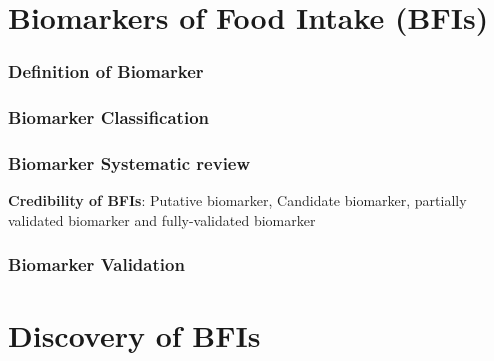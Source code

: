 \section{Biomarkers of Food Intake (BFIs)}
\subsubsection{Definition of Biomarker}

\subsubsection{Biomarker Classification}


\subsubsection{Biomarker Systematic review}
\textbf{Credibility of BFIs}: Putative biomarker, Candidate biomarker, partially validated biomarker and fully-validated biomarker

\subsubsection{Biomarker Validation}


\section{Discovery of BFIs}